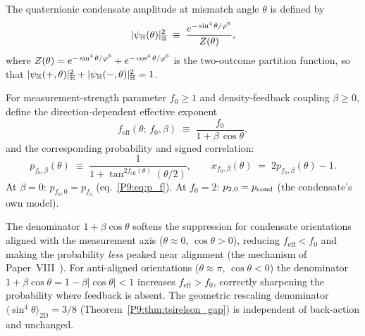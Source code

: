 \begin{definition}
\label{P9:def:H_amplitude}
The quaternionic condensate amplitude at mismatch angle $\theta$ is defined by
\begin{equation}
  |\psi_{\mathbb{H}}(\theta)|_{\mathbb{H}}^2
  \;\equiv\;
  \frac{e^{-\sin^4\theta/\varphi^6}}{Z(\theta)},
  \label{P9:eq:psi_H}
\end{equation}
where $Z(\theta) = e^{-\sin^4\theta/\varphi^6}+e^{-\cos^4\theta/\varphi^6}$
is the two-outcome partition function, so that $|\psi_{\mathbb{H}}(+,\theta)|_{\mathbb{H}}^2
+ |\psi_{\mathbb{H}}(-,\theta)|_{\mathbb{H}}^2 = 1$.
\end{definition}

\begin{definition}
\label{P9:def:p_f_beta}
For measurement-strength parameter $f_0\geq1$ and density-feedback
coupling $\beta\geq0$, define the direction-dependent effective exponent
\begin{equation}
  f_\mathrm{eff}(\theta;\,f_0,\beta)
  \;\equiv\; \frac{f_0}{1 + \beta\,\cos\theta},
  \label{P9:eq:f_eff}
\end{equation}
and the corresponding probability and signed correlation:
\begin{equation}
  p_{f_0,\beta}(\theta)
  \;\equiv\; \frac{1}{1+\tan^{2f_\mathrm{eff}(\theta)}(\theta/2)},
  \qquad
  x_{f_0,\beta}(\theta) \;=\; 2p_{f_0,\beta}(\theta)-1.
  \label{P9:eq:p_fb}
\end{equation}
At $\beta=0$: $p_{f_0,0} = p_{f_0}$ (eq.~\eqref{P9:eq:p_f}).
At $f_0=2$: $p_{2,0} = p_{\mathrm{cond}}$ (the condensate's own model).
\end{definition}

\begin{remark}
\label{P9:rem:feff_physical_origin}
The denominator $1+\beta\cos\theta$ softens the suppression for
condensate orientations aligned with the measurement axis
($\theta\approx0$, $\cos\theta>0$), reducing $f_\mathrm{eff}<f_0$
and making the probability \emph{less} peaked near alignment
(the mechanism of Paper~VIII~\cite{Paper8}).
For anti-aligned orientations ($\theta\approx\pi$, $\cos\theta<0$)
the denominator $1+\beta\cos\theta = 1-\beta|\cos\theta| < 1$
increases $f_\mathrm{eff}>f_0$,
correctly sharpening the probability where feedback is absent.
The geometric rescaling denominator
$\langle\sin^4\theta\rangle_{2\mathrm{D}}=3/8$
(Theorem~\ref{P9:thm:tsirelson_gap}) is independent of back-action and unchanged.
\end{remark}

